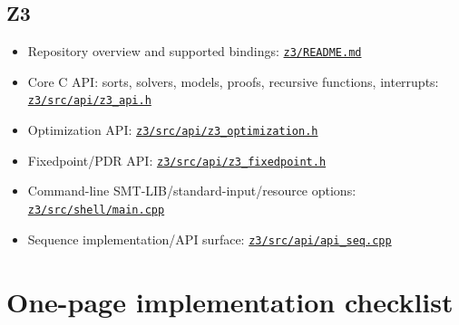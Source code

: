 \documentclass[11pt,oneside]{article}
\newcommand{\sourcelink}[2]{\href{#1}{\nolinkurl{#2}}}
\begin{document}
\subsection*{Z3}

\begin{itemize}
  \item Repository overview and supported bindings:
  \sourcelink{https://github.com/Z3Prover/z3/blob/0bd679a404bee551393fd94ca813ccc7eb034973/README.md}{z3/README.md}
  \item Core C API: sorts, solvers, models, proofs, recursive functions, interrupts:
  \sourcelink{https://github.com/Z3Prover/z3/blob/0bd679a404bee551393fd94ca813ccc7eb034973/src/api/z3_api.h}{z3/src/api/z3_api.h}
  \item Optimization API:
  \sourcelink{https://github.com/Z3Prover/z3/blob/0bd679a404bee551393fd94ca813ccc7eb034973/src/api/z3_optimization.h}{z3/src/api/z3_optimization.h}
  \item Fixedpoint/PDR API:
  \sourcelink{https://github.com/Z3Prover/z3/blob/0bd679a404bee551393fd94ca813ccc7eb034973/src/api/z3_fixedpoint.h}{z3/src/api/z3_fixedpoint.h}
  \item Command-line SMT-LIB/standard-input/resource options:
  \sourcelink{https://github.com/Z3Prover/z3/blob/0bd679a404bee551393fd94ca813ccc7eb034973/src/shell/main.cpp}{z3/src/shell/main.cpp}
  \item Sequence implementation/API surface:
  \sourcelink{https://github.com/Z3Prover/z3/blob/0bd679a404bee551393fd94ca813ccc7eb034973/src/api/api_seq.cpp}{z3/src/api/api_seq.cpp}
\end{itemize}

\section{One-page implementation checklist}
\end{document}
